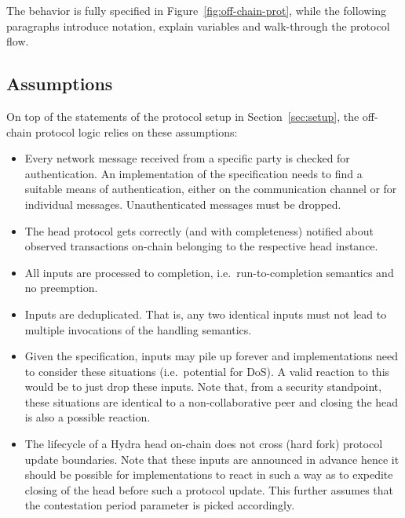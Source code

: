 
The behavior is fully specified in Figure~\ref{fig:off-chain-prot}, while the
following paragraphs introduce notation, explain variables and walk-through the
protocol flow.

\subsection{Assumptions}

On top of the statements of the protocol setup in Section~\ref{sec:setup}, the
off-chain protocol logic relies on these assumptions:
\begin{itemize}
	\item Every network message received from a specific party is checked for
	      authentication. An implementation of the specification needs to find a
	      suitable means of authentication, either on the communication channel or
	      for individual messages. Unauthenticated messages must be dropped.
	\item The head protocol gets correctly (and with completeness) notified about
	      observed transactions on-chain belonging to the respective head
	      instance.
	\item All inputs are processed to completion, i.e.\ run-to-completion
	      semantics and no preemption.
	\item Inputs are deduplicated. That is, any two identical inputs must not lead
	      to multiple invocations of the handling semantics.
	\item Given the specification, inputs may pile up forever and implementations
	      need to consider these situations (i.e.\ potential for DoS). A valid
	      reaction to this would be to just drop these inputs. Note that, from a
	      security standpoint, these situations are identical to a
	      non-collaborative peer and closing the head is also a possible reaction.
	\item The lifecycle of a Hydra head on-chain does not cross (hard fork)
	      protocol update boundaries. Note that these inputs are announced in
	      advance hence it should be possible for implementations to react in such
	      a way as to expedite closing of the head before such a protocol update.
	      This further assumes that the contestation period parameter is picked
	      accordingly.
\end{itemize}

